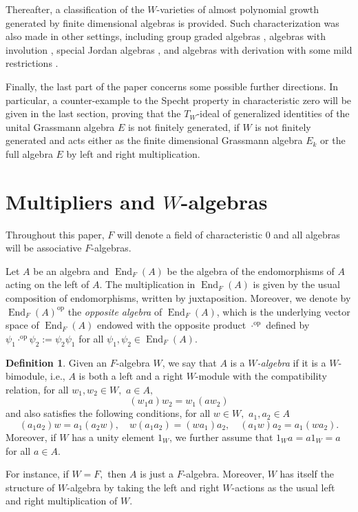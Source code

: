\documentclass[reqno]{amsart}
\theoremstyle{definition}
\newtheorem{definition}[theorem]{Definition}
\numberwithin{equation}{section}
\numberwithin{theorem}{section}
\DeclareMathOperator{\End}{End}
\DeclareMathOperator{\op}{op}
\begin{document}
Thereafter, a classification of the $W$-varieties of almost polynomial growth generated by finite dimensional algebras is provided. Such characterization was also made in other settings, including group graded algebras \cite{Valenti2011}, algebras with involution \cite{GiambrunoMishchenko2001}, special Jordan algebras \cite{Martino2019}, and algebras with derivation with some mild restrictions \cite{Argenti2024, Rizzo2023}. 


Finally, the last part of the paper concerns some possible further directions. In particular, a counter-example to the Specht property in characteristic zero will be given in the last section, proving that the $T_W$-ideal of generalized identities of the unital Grassmann algebra $E$ is not finitely generated, if $W$ is not finitely generated and acts either as the finite dimensional Grassmann algebra $E_k$ or the full algebra $E$ by left and right multiplication.


\section{Multipliers and $W$-algebras}
Throughout this paper, $F$ will denote a field of characteristic $0$ and all algebras will be associative $F$-algebras.

Let $A$ be an algebra and $\End_F(A)$ be the algebra of the endomorphisms of $A$ acting on the left of $A.$ The multiplication in $\End_F(A)$ is given by the usual composition of endomorphisms, written by juxtaposition. Moreover, we denote by $\End_F(A)^{\op}$  the \emph{opposite algebra} of $\End_F(A)$,  which is the underlying vector space of $\End_F(A)$ endowed with the opposite product $\cdot^{\op}$ defined by $\psi_1\cdot^{\op} \psi_2:=\psi_2 \psi_1$ for all $\psi_1, \psi_2\in \End_F(A)$.


\begin{definition}\label{def: W-algebra}
    Given an $F$-algebra $W$, we say that $A$ is a \emph{$W$-algebra} if it is a $W$-bimodule, i.e., $A$ is both a left and a right $W$-module with the compatibility relation, for all $w_1,w_2\in W,$ $a\in A,$
\begin{equation}\label{eq: compatibility bimodule}
  (w_1a)w_2 = w_1(aw_2)
\end{equation}
  and also satisfies the following conditions, for all $w\in W,$ $a_1,a_2\in A$
	\begin{equation}\label{conditions W-algebra}
		 (a_1 a_2)w=a_1(a_2 w), \quad w(a_1 a_2)=(wa_1)a_2, \quad (a_1 w) a_2= a_1 (w a_2).
	\end{equation}
Moreover, if $W$ has a unity element $1_W$, we further assume that $1_W a=a 1_W=a$ for all $a\in A$. 
\end{definition}
For instance, if $W=F,$ then $A$ is just a $F$-algebra. Moreover, $W$ has itself the structure of $W$-algebra by taking the left and right $W$-actions as the usual left and right multiplication of $W.$
\end{document}
